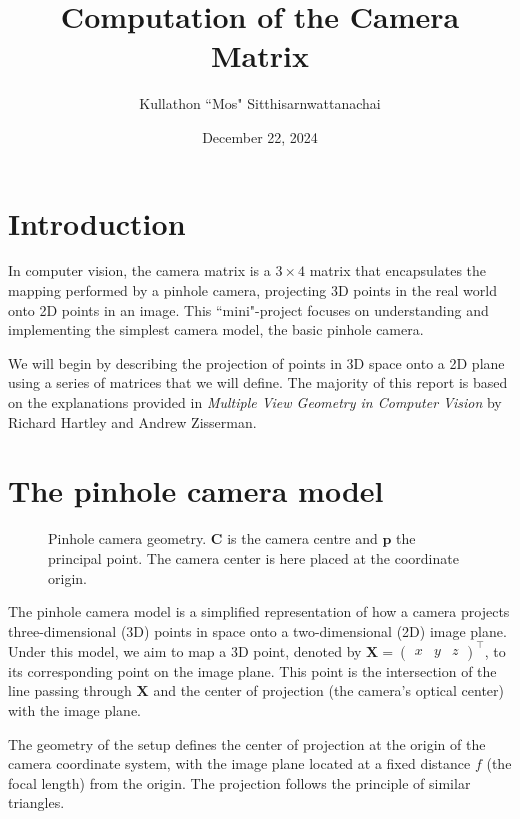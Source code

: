 \documentclass[12pt]{article}
\title{Computation of the Camera Matrix}
\author{Kullathon ``Mos" Sitthisarnwattanachai}
\date{December 22, 2024}
\begin{document}
\maketitle

\section{Introduction}

In computer vision, the camera matrix is a $3 \times 4$ matrix that encapsulates the mapping performed by a pinhole camera, projecting 3D points in the real world onto 2D points in an image. This ``mini"-project focuses on understanding and implementing the simplest camera model, the basic pinhole camera.

We will begin by describing the projection of points in 3D space onto a 2D plane using a series of matrices that we will define. The majority of this report is based on the explanations provided in \textit{Multiple View Geometry in Computer Vision} by Richard Hartley and Andrew Zisserman.

\section{The pinhole camera model}

\begin{figure}
    \centering 
    
    \caption{Pinhole camera geometry. $\mathbf{C}$ is the camera centre and $\mathbf{p}$ the principal point. The camera center is here placed at the coordinate origin.}
    \label{fig:enter-label}
\end{figure}

The pinhole camera model is a simplified representation of how a camera projects three-dimensional (3D) points in space onto a two-dimensional (2D) image plane. Under this model, we aim to map a 3D point, denoted by 
$\mathbf{X} = \begin{pmatrix} x & y & z \end{pmatrix}^\top$, 
to its corresponding point on the image plane. This point is the intersection of the line passing through $\mathbf{X}$ and the center of projection (the camera's optical center) with the image plane.

The geometry of the setup defines the center of projection at the origin of the camera coordinate system, with the image plane located at a fixed distance $f$ (the focal length) from the origin. The projection follows the principle of similar triangles.
\end{document}
